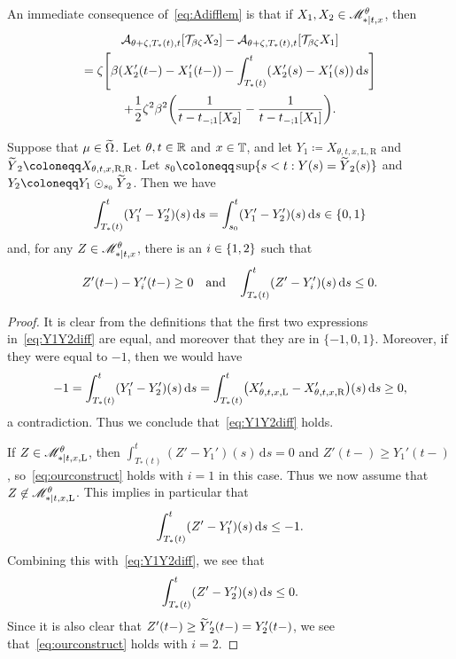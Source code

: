 \documentclass[AHL,Unicode,longabstracts]{cedram}
\newcounter{setofcase}
\newcounter{case}[setofcase]
\newcommand*\scM{\mathscr{M}}
\newcommand*\TT{\mathbb{T}}
\newcommand*\RR{\mathbb{R}}
\newcommand{\clA}{\mathcal{A}}
\newcommand{\clT}{\mathcal{T}}
\newcommand*\st{\mathrel{:}}
\newcommand*\dif{\mathrm{d}}
\newcommand*\Left{\mathrm{L}}
\newcommand*\Right{\mathrm{R}}
\let\oldin\in
\renewcommand{\in}{\mathchoice{\oldin}{\oldin}{\,\oldin\,}{\,\oldin\,}}
\let\originalleft\left
\let\originalright\right
\renewcommand{\left}{\mathopen{}\mathclose\bgroup\originalleft}
\renewcommand{\right}{\aftergroup\egroup\originalright}
\let\oldtilde\tilde
\renewcommand*{\tilde}[1]{\mathchoice{\widetilde{#1}}{\widetilde{#1}}{\oldtilde{#1}}{\oldtilde{#1}}}
\newcommand*\TT{\mathbb{T}}
\newcommand*\RR{\mathbb{R}}
\begin{document}
An immediate consequence of~\eqref{eq:Adifflem} is that if $X_{1},X_{2}\in\scM_{*\mid t,x}^{\theta}$, then
\begin{multline}\label{eq:Adiff-double}
\clA_{\theta+\zeta,T_{*}(t),t}  \left[\clT_{\beta\zeta}X_{2}\right]-\clA_{\theta+\zeta,T_{*}(t),t}[\clT_{\beta\zeta}X_{1}]\\
=\zeta\left[\beta\left(X_{2}'(t-)-X'_{1}(t-)\right)-\int_{T_{*}(t)}^{t}\left(X_{2}'(s)-X_{1}'(s)\right)\,\dif s\right]\\
+\frac{1}{2}\zeta^{2}\beta^{2}\left(\frac{1}{t-t_{-;1}[X_{2}]}-\frac{1}{t-t_{-;1}[X_{1}]}\right).
\end{multline}

\begin{prop}\label{prop:findYs}
Suppose that $\mu\in\widetilde{\Omega}$. Let $\theta,t\in\RR$ and $x\in\TT$, and let $Y_{1}\coloneqq X_{\theta,t,x,\Left,\Right}$ and $\tilde{Y}_{2}\coloneqq X_{\theta,t,x,\Right,\Right}$. Let $s_{0}\coloneqq\sup\{s<t\st Y(s)=\tilde{Y}_{2}(s)\}$ and $Y_{2}\coloneqq Y_{1}\odot_{s_{0}}\tilde{Y}_{2}$. Then we have
\begin{equation}\label{eq:Y1Y2diff}
\int_{T_{*}(t)}^{t}\left(Y_{1}'-Y_{2}'\right)(s)\,\dif s=\int_{s_{0}}^{t}\left(Y_{1}'-Y_{2}'\right)(s)\,\dif s\in\{0,1\}
\end{equation}
and, for any $Z\in\scM_{*\mid t,x}^{\theta}$, there is an $i\in\{1,2\}$ such that
\begin{equation}\label{eq:ourconstruct}
Z'(t-)-Y_{i}'(t-)\ge0\quad\text{and}\quad\int_{T_{*}(t)}^{t}\left(Z'-Y_{i}'\right)(s)\,\dif s\le0.
\end{equation}
\end{prop}

\begin{proof}
It is clear from the definitions that the first two expressions in~\eqref{eq:Y1Y2diff} are equal, and moreover that they are in $\{-1,0,1\}$. Moreover, if they were equal to $-1$, then we would have
\[
-1=\int_{T_{*}(t)}^{t}\left(Y_{1}'-Y_{2}'\right)(s)\,\dif s=\int_{T_{*}(t)}^{t}\left(X_{\theta,t,x,\Left}'-X'_{\theta,t,x,\Right}\right)(s)\,\dif s\ge0,
\]
a contradiction. Thus we conclude that~\eqref{eq:Y1Y2diff} holds.

If $Z\in\scM_{*\mid t,x,\Left}^{\theta}$, then $\int_{T_{*}(t)}^{t}(Z'-Y_{1}')(s)\,\dif s=0$ and $Z'(t-)\ge Y_{1}'(t-)$, so~\eqref{eq:ourconstruct} holds with $i=1$ in this case. Thus we now assume that $Z\not\in\scM_{*\mid t,x,\Left}^{\theta}$. This implies in particular that
\[
\int_{T_{*}(t)}^{t}\left(Z'-Y_{1}'\right)(s)\,\dif s\le-1.
\]
Combining this with~\eqref{eq:Y1Y2diff}, we see that
\[
\int_{T_{*}(t)}^{t}\left(Z'-Y_{2}'\right)(s)\,\dif s\le0.
\]
Since it is also clear that $Z'(t-)\ge\tilde{Y}_{2}'(t-)=Y_{2}'(t-)$, we see that~\eqref{eq:ourconstruct} holds with $i=2$.
\end{proof}
\end{document}
